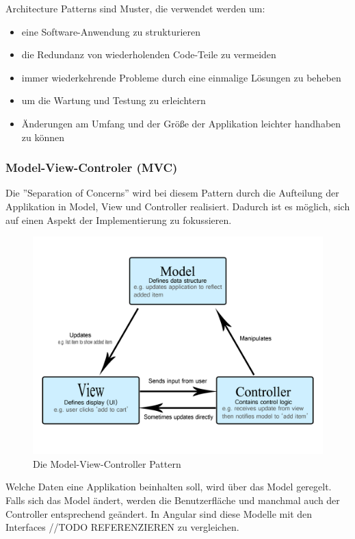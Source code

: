 Architecture Patterns sind Muster, die verwendet werden um:
\begin{itemize}
  \item eine Software-Anwendung zu strukturieren
  \item die Redundanz von wiederholenden Code-Teile zu vermeiden 
  \item immer wiederkehrende Probleme durch eine einmalige Lösungen zu beheben
  \item um die Wartung und Testung zu erleichtern
  \item Änderungen am Umfang und der Größe der Applikation leichter handhaben zu können
\end{itemize}

\cite{MVCmdn}
\cite{MVVM}
\cite{MVC}

\subsubsection{Model-View-Controler (MVC)}
Die ”Separation of Concerns” wird bei diesem Pattern durch die Aufteilung der Applikation in Model, View und Controller realisiert. Dadurch ist es möglich, sich auf einen Aspekt der Implementierung zu fokussieren. 

\begin{figure} [h t]
  \centering
  \includegraphics[scale=0.5]{pics/mvc.png}
  \caption{Die Model-View-Controller Pattern \cite{MVCmdn}}
  \label{fig:tech:front:mvc-architecture}
\end{figure}

Welche Daten eine Applikation beinhalten soll, wird über das Model geregelt. Falls sich das Model ändert, werden die Benutzerfläche und manchmal auch der Controller entsprechend geändert. In Angular sind diese Modelle mit den Interfaces //TODO REFERENZIEREN  zu vergleichen.

